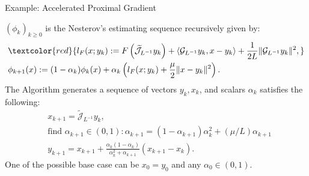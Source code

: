 \documentclass[11pt]{beamer}
\begin{document}
        \begin{frame}{Example: Accelerated Proximal Gradient}
            \begin{definition}
                \label{def:nes-est-seq-pg}
                {\small
                    $(\phi_k)_{k \ge0}$ is the Nesterov's estimating sequence recursively given by: 
                    \begin{align*}
                        &\textcolor{red}{
                            l_F(x; y_k) := 
                            F\left(\widetilde{\mathcal J}_{L^{-1}} y_k \right) 
                            + \langle \mathcal G_{L^{-1}}y_k, x - y_k\rangle + 
                            \frac{1}{2L}\Vert \mathcal G_{L^{-1}}y_k\Vert^2,
                        } 
                        \\
                        & 
                        \phi_{k + 1}(x)
                        := (1 - \alpha_k)\phi_k (x) + 
                        \alpha_k 
                        \left(
                            l_F(x; y_k) + \frac{\mu}{2}\Vert x - y_k\Vert^2
                        \right). 
                    \end{align*}
                    The Algorithm generates a sequence of vectors $y_k, x_k$, and scalars $\alpha_k$ satisfies the following: 
                    \begin{align*}
                        &x_{k + 1} = \widetilde{\mathcal J}_{L^{-1}} y_k, 
                        \\
                        & \text{find } \alpha_{k + 1} \in (0, 1): 
                        \alpha_{k + 1} = (1 - \alpha_{k + 1})\alpha_k^{2} + (\mu/L) \alpha_{k + 1}
                        \\
                        &y_{k + 1} = x_{k + 1} + \frac{\alpha_k(1 - \alpha_k)}{\alpha_k^2 + \alpha_{k + 1}}(x_{k + 1} - x_k). 
                    \end{align*}
                    One of the possible base case can be $x_0 = y_0$ and any $\alpha_0 \in (0, 1)$. 
                }
            \end{definition}
        \end{frame}
\end{document}
